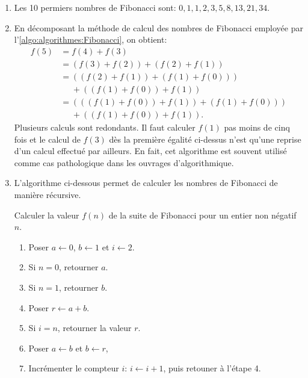 \begin{exercice}
\begin{sol}
\begin{enumerate}
\begin{algorithme}
\begin{Schunk}
        \end{Schunk}
      \end{algorithme}
    \item Les 10 permiers nombres de Fibonacci sont:
      $0, 1, 1, 2, 3, 5, 8, 13, 21, 34$.
    \item En décomposant la méthode de calcul des nombres de Fibonacci
      employée par l'\autoref{algo:algorithmes:Fibonacci}, on obtient:
      \begin{align*}
        f(5)
        &= f(4) + f(3) \\
        &= (f(3) + f(2)) + (f(2) + f(1)) \\
        &= ((f(2) + f(1)) + (f(1) + f(0))) \\
        &\phantom{=} + ((f(1) + f(0)) + f(1)) \\
        &= (((f(1) + f(0)) + f(1)) + (f(1) + f(0))) \\
        &\phantom{=} + ((f(1) + f(0)) + f(1)).
      \end{align*}
      Plusieurs calculs sont redondants. Il faut calculer $f(1)$ pas
      moins de cinq fois et le calcul de $f(3)$ dès la première
      égalité ci-dessus n'est qu'une reprise d'un calcul effectué par
      ailleurs. En fait, cet algorithme est souvent utilisé comme cas
      pathologique dans les ouvrages d'algorithmique.
    \item L'algorithme ci-dessous permet de calculer les nombres de
      Fibonacci de manière récursive.
      \begin{algorithme}
        \label{algo:algorithmes:Fibonacci-iter}
        Calculer la valeur $f(n)$ de la suite de Fibonacci pour un entier non négatif $n$.
        \begin{enumerate}[1.]
        \item Poser $a \leftarrow 0$, $b \leftarrow 1$ et
          $i \leftarrow 2$.
        \item Si $n = 0$, retourner $a$.
        \item Si $n = 1$, retourner $b$.
        \item Poser $r \leftarrow a + b$.
        \item Si $i = n$, retourner la valeur $r$.
        \item Poser $a \leftarrow b$ et $b \leftarrow r$,
        \item Incrémenter le compteur $i$: $i \leftarrow i + 1$, puis
          retouner à l'étape 4.
        \end{enumerate}
      \end{algorithme}
    \end{enumerate}
  \end{sol}
\end{exercice}

